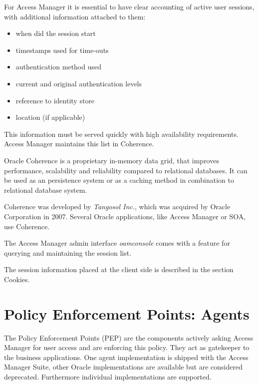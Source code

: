 \documentclass[11pt]{report}
\begin{document}
For Access Manager it is essential to have clear accounting of active
user sessions, with additional information attached to them:

\begin{itemize}
    \item when did the session start
    \item timestamps used for time-outs
    \item authentication method used
    \item current and original authentication levels
    \item reference to identity store
    \item location (if applicable)
\end{itemize}

This information must be served quickly with high availability
requirements. Access Manager maintains this list in Coherence.

\begin{framed}

    Oracle Coherence is a proprietary in-memory data grid, that improves
    performance, scalability and reliability compared to relational
    databases. It can be used as an persistence system or as a caching
    method in combination to relational database system.
    
    Coherence was developed by \emph{Tangosol Inc.}, which was acquired 
    by Oracle Corporation in 2007. Several Oracle applications, like 
    Access Manager or SOA, use Coherence.

\end{framed}

The Access Manager admin interface \emph{oamconsole} comes with a
feature for querying and maintaining the session list.

The session information placed at the client side is described in the
section Cookies.


\section{Policy Enforcement Points: Agents}

The Policy Enforcement Points (PEP) are the components actively asking
Access Manager for user access and are enforcing this policy. They act
as gatekeeper to the business applications. One agent implementation is
shipped with the Access Manager Suite, other Oracle implementations are
available but are considered deprecated. Furthermore individual
implementations are supported.
\end{document}
